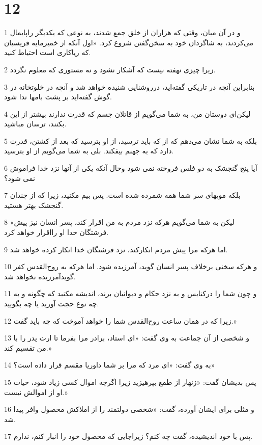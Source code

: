 \chapter{12}

\par 1 و در آن میان، وقتی که هزاران از خلق جمع شدند، به نوعی که یکدیگر راپایمال می‌کردند، به شاگردان خود به سخن‌گفتن شروع کرد. «اول آنکه از خمیرمایه فریسیان که ریاکاری است احتیاط کنید.
\par 2 زیرا چیزی نهفته نیست که آشکار نشود و نه مستوری که معلوم نگردد.
\par 3 بنابراین آنچه در تاریکی گفته‌اید، درروشنایی شنیده خواهد شد و آنچه در خلوتخانه در گوش گفته‌اید بر پشت بامها ندا شود.
\par 4 لیکن‌ای دوستان من، به شما می‌گویم از قاتلان جسم که قدرت ندارند بیشتر از این بکنند، ترسان مباشید.
\par 5 بلکه به شما نشان می‌دهم که از که باید ترسید، از او بترسید که بعد از کشتن، قدرت دارد که به جهنم بیفکند. بلی به شما می‌گویم از او بترسید.
\par 6 آیا پنج گنجشک به دو فلس فروخته نمی شود وحال آنکه یکی از آنها نزد خدا فراموش نمی شود؟
\par 7 بلکه مویهای سر شما همه شمرده شده است. پس بیم مکنید، زیرا که از چندان گنجشک بهتر هستید.
\par 8 «لیکن به شما می‌گویم هر‌که نزد مردم به من اقرار کند، پسر انسان نیز پیش فرشتگان خدا او رااقرار خواهد کرد.
\par 9 اما هر‌که مرا پیش مردم انکارکند، نزد فرشتگان خدا انکار کرده خواهد شد.
\par 10 و هر‌که سخنی برخلاف پسر انسان گوید، آمرزیده شود. اما هر‌که به روح‌القدس کفر گویدآمرزیده نخواهد شد.
\par 11 و چون شما را درکنایس و به نزد حکام و دیوانیان برند، اندیشه مکنید که چگونه و به چه نوع حجت آورید یا چه بگویید.
\par 12 زیرا که در همان ساعت روح‌القدس شما را خواهد آموخت که چه باید گفت.»
\par 13 و شخصی از آن جماعت به وی گفت: «ای استاد، برادر مرا بفرما تا ارث پدر را با من تقسیم کند.»
\par 14 به وی گفت: «ای مرد که مرا بر شما داوریا مقسم قرار داده است؟»
\par 15 پس بدیشان گفت: «زنهار از طمع بپرهیزید زیرا اگرچه اموال کسی زیاد شود، حیات او از اموالش نیست.»
\par 16 و مثلی برای ایشان آورده، گفت: «شخصی دولتمند را از املاکش محصول وافر پیدا شد.
\par 17 پس با خود اندیشیده، گفت چه کنم؟ زیراجایی که محصول خود را انبار کنم، ندارم.
